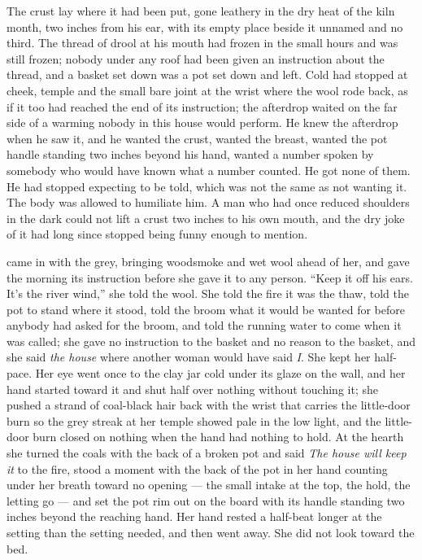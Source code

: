The crust lay where it had been put, gone leathery in the dry heat of the kiln month, two inches from his ear, with its empty place beside it unnamed and no third. The thread of drool at his mouth had frozen in the small hours and was still frozen; nobody under any roof had been given an instruction about the thread, and a basket set down was a pot set down and left. Cold had stopped at cheek, temple and the small bare joint at the wrist where the wool rode back, as if it too had reached the end of its instruction; the afterdrop waited on the far side of a warming nobody in this house would perform. He knew the afterdrop when he saw it, and he wanted the crust, wanted the breast, wanted the pot handle standing two inches beyond his hand, wanted a number spoken by somebody who would have known what a number counted. He got none of them. He had stopped expecting to be told, which was not the same as not wanting it. The body was allowed to humiliate him. A man who had once reduced shoulders in the dark could not lift a crust two inches to his own mouth, and the dry joke of it had long since stopped being funny enough to mention.

 came in with the grey, bringing woodsmoke and wet wool ahead of her, and gave the morning its instruction before she gave it to any person. “Keep it off his ears. It's the river wind,” she told the wool. She told the fire it was the thaw, told the pot to stand where it stood, told the broom what it would be wanted for before anybody had asked for the broom, and told the running water to come when it was called; she gave no instruction to the basket and no reason to the basket, and she said \emph{the house} where another woman would have said \emph{I}. She kept her half-pace. Her eye went once to the clay jar cold under its glaze on the wall, and her hand started toward it and shut half over nothing without touching it; she pushed a strand of coal-black hair back with the wrist that carries the little-door burn so the grey streak at her temple showed pale in the low light, and the little-door burn closed on nothing when the hand had nothing to hold. At the hearth she turned the coals with the back of a broken pot and said \emph{The house will keep it} to the fire, stood a moment with the back of the pot in her hand counting under her breath toward no opening --- the small intake at the top, the hold, the letting go --- and set the pot rim out on the board with its handle standing two inches beyond the reaching hand. Her hand rested a half-beat longer at the setting than the setting needed, and then went away. She did not look toward the bed.


